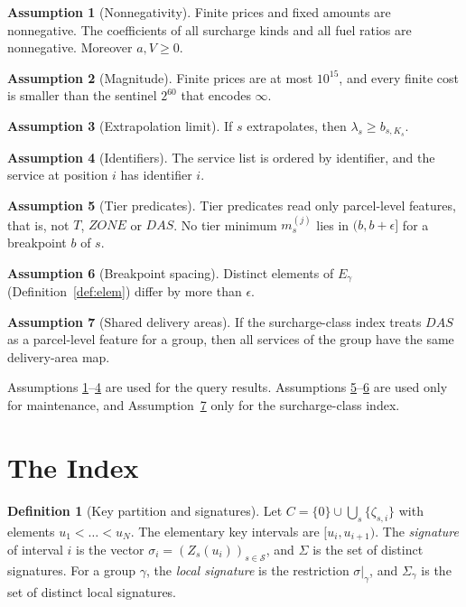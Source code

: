 \documentclass[11pt]{article}
\theoremstyle{definition}
\newtheorem{definition}[theorem]{Definition}
\newtheorem{assumption}{Assumption}
\theoremstyle{remark}
\newcommand{\SC}{\mathcal S}
\begin{document}
\begin{assumption}[Nonnegativity]\label{as:nonneg}
Finite prices and fixed amounts are nonnegative. The coefficients of all surcharge kinds
and all fuel ratios are nonnegative. Moreover $a,V\ge 0$.
\end{assumption}
\begin{assumption}[Magnitude]\label{as:mag}
Finite prices are at most $10^{15}$, and every finite cost is smaller than the sentinel
$2^{60}$ that encodes $\infty$.
\end{assumption}
\begin{assumption}[Extrapolation limit]\label{as:extrap}
If $s$ extrapolates, then $\lambda_s\ge b_{s,K_s}$.
\end{assumption}
\begin{assumption}[Identifiers]\label{as:sid}
The service list is ordered by identifier, and the service at position $i$ has
identifier $i$.
\end{assumption}
\begin{assumption}[Tier predicates]\label{as:tier}
Tier predicates read only parcel-level features, that is, not $T$, $\mathit{ZONE}$ or
$\mathit{DAS}$. No tier minimum $m^{(j)}_s$ lies in $(b,b+\epsilon]$ for a breakpoint $b$ of
$s$.
\end{assumption}
\begin{assumption}[Breakpoint spacing]\label{as:spacing}
Distinct elements of $E_\gamma$ (Definition~\ref{def:elem}) differ by more than $\epsilon$.
\end{assumption}
\begin{assumption}[Shared delivery areas]\label{as:das}
If the surcharge-class index treats $\mathit{DAS}$ as a parcel-level feature for a group,
then all services of the group have the same delivery-area map.
\end{assumption}

Assumptions \ref{as:nonneg}--\ref{as:sid} are used for the query results. Assumptions
\ref{as:tier}--\ref{as:spacing} are used only for maintenance, and Assumption~\ref{as:das}
only for the surcharge-class index.

\section{The Index}\label{sec:index}

\begin{definition}[Key partition and signatures]\label{def:sig}
Let $C=\{0\}\cup\bigcup_s\{\zeta_{s,i}\}$ with elements $u_1<\dots<u_N$. The elementary key
intervals are $[u_i,u_{i+1})$. The \emph{signature} of interval $i$ is the vector
$\sigma_i=(Z_s(u_i))_{s\in\SC}$, and $\Sigma$ is the set of distinct signatures. For a group
$\gamma$, the \emph{local signature} is the restriction $\sigma|_\gamma$, and $\Sigma_\gamma$
is the set of distinct local signatures.
\end{definition}
\end{document}
